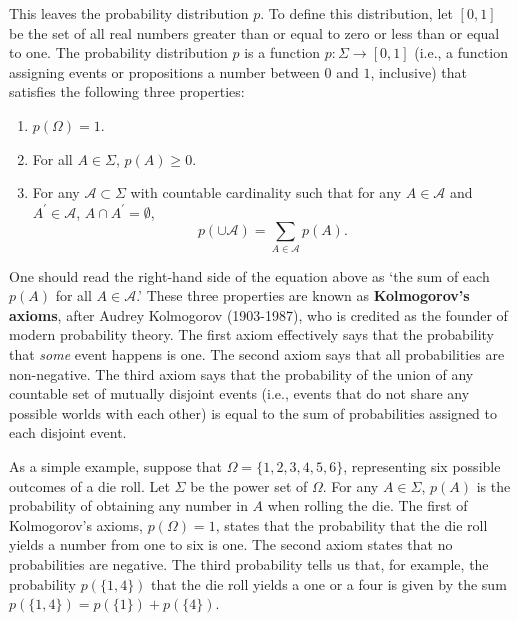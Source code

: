 \documentclass[11pt]{article}
\theoremstyle{definition}
\theoremstyle{remark}
\begin{document}
This leaves the probability distribution $p$. To define this distribution, let $[0,1]$ be the set of all real numbers greater than or equal to zero or less than or equal to one. The probability distribution $p$ is a function $p:\Sigma\rightarrow[0,1]$ (i.e., a function assigning events or propositions a number between $0$ and $1$, inclusive) that satisfies the following three properties:
\begin{enumerate}
    \item $p(\Omega)=1$.

    \item For all $A\in\Sigma$, $p(A)\geq 0$.
    
    \item For any $\mathcal{A}\subset\Sigma$ with countable cardinality such that for any $A\in\mathcal{A}$ and $A^{\prime}\in\mathcal{A}$, $A\cap A^{\prime}=\emptyset$, $$p(\cup\mathcal{A})=\sum_{A\in\mathcal{A}}p(A).$$ 
\end{enumerate}
One should read the right-hand side of the equation above as `the sum of each $p(A)$ for all $A\in\mathcal{A}$.' These three properties are known as \textbf{Kolmogorov's axioms}, after Audrey Kolmogorov (1903-1987), who is credited as the founder of modern probability theory. The first axiom effectively says that the probability that \textit{some} event happens is one. The second axiom says that all probabilities are non-negative. The third axiom says that the probability of the union of any countable set of mutually disjoint events (i.e., events that do not share any possible worlds with each other) is equal to the sum of probabilities assigned to each disjoint event.\par

As a simple example, suppose that $\Omega=\{1,2,3,4,5,6\}$, representing six possible outcomes of a die roll. Let $\Sigma$ be the power set of $\Omega$. For any $A\in\Sigma$, $p(A)$ is the probability of obtaining any number in $A$ when rolling the die. The first of Kolmogorov's axioms, $p(\Omega)=1$, states that the probability that the die roll yields a number from one to six is one. The second axiom states that no probabilities are negative. The third probability tells us that, for example, the probability $p(\{1,4\})$ that the die roll yields a one or a four is given by the sum $p(\{1,4\})=p(\{1\}) + p(\{4\})$.\par
\end{document}
